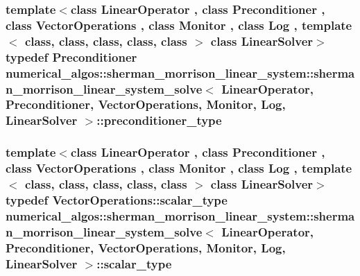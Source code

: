 \hypertarget{classnumerical__algos_1_1sherman__morrison__linear__system_1_1sherman__morrison__linear__system__solve_aecf0ad1e8bec52c135746a0890d0cb4e}{
\subsubsection[{preconditioner\-\_\-type}]{\setlength{\rightskip}{0pt plus 5cm}template$<$class Linear\-Operator , class Preconditioner , class Vector\-Operations , class Monitor , class Log , template$<$ class, class, class, class, class $>$ class Linear\-Solver$>$ typedef Preconditioner {\bf numerical\-\_\-algos\-::sherman\-\_\-morrison\-\_\-linear\-\_\-system\-::sherman\-\_\-morrison\-\_\-linear\-\_\-system\-\_\-solve}$<$ Linear\-Operator, Preconditioner, Vector\-Operations, Monitor, Log, Linear\-Solver $>$\-::{\bf preconditioner\-\_\-type}}}\label{classnumerical__algos_1_1sherman__morrison__linear__system_1_1sherman__morrison__linear__system__solve_aecf0ad1e8bec52c135746a0890d0cb4e}
\hypertarget{classnumerical__algos_1_1sherman__morrison__linear__system_1_1sherman__morrison__linear__system__solve_a818cbec8eb2cd038cf6f25b940c3f1bb}{
\subsubsection[{scalar\-\_\-type}]{\setlength{\rightskip}{0pt plus 5cm}template$<$class Linear\-Operator , class Preconditioner , class Vector\-Operations , class Monitor , class Log , template$<$ class, class, class, class, class $>$ class Linear\-Solver$>$ typedef Vector\-Operations\-::scalar\-\_\-type {\bf numerical\-\_\-algos\-::sherman\-\_\-morrison\-\_\-linear\-\_\-system\-::sherman\-\_\-morrison\-\_\-linear\-\_\-system\-\_\-solve}$<$ Linear\-Operator, Preconditioner, Vector\-Operations, Monitor, Log, Linear\-Solver $>$\-::{\bf scalar\-\_\-type}}}\label{classnumerical__algos_1_1sherman__morrison__linear__system_1_1sherman__morrison__linear__system__solve_a818cbec8eb2cd038cf6f25b940c3f1bb}
